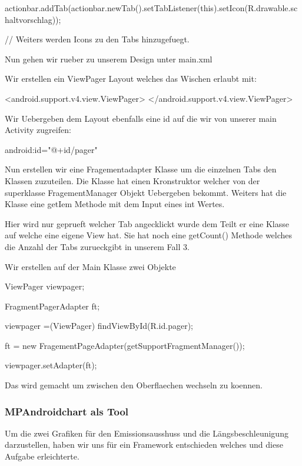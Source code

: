 actionbar.addTab(actionbar.newTab().setTabListener(this).setIcon(R.drawable.schaltvorschlag));

// Weiters werden Icons zu den Tabs hinzugefuegt.


Nun gehen wir rueber zu unserem Design unter main.xml

Wir erstellen ein ViewPager Layout welches das Wischen erlaubt mit:

<android.support.v4.view.ViewPager> </android.support.v4.view.ViewPager>

Wir Uebergeben dem Layout ebenfalls eine id auf die wir von unserer main Activity zugreifen: 

android:id="@+id/pager"



Nun erstellen wir eine Fragementadapter Klasse um die einzelnen Tabs den Klassen zuzuteilen. 
Die Klasse hat einen Kronstruktor welcher von der superklasse FragementManager Objekt Uebergeben bekommt.
Weiters hat die Klasse eine getIem Methode mit dem Input eines int Wertes. 


Hier wird nur geprueft welcher Tab angecklickt wurde dem Teilt er eine Klasse auf welche eine eigene View hat.
Sie hat noch eine getCount() Methode welches die Anzahl der Tabs zurueckgibt in unserem Fall 3.


Wir erstellen auf der Main Klasse zwei Objekte 

ViewPager viewpager;

FragmentPagerAdapter ft;

viewpager =(ViewPager) findViewById(R.id.pager);

ft = new FragementPageAdapter(getSupportFragmentManager());

viewpager.setAdapter(ft);

Das wird gemacht um zwischen den Oberflaechen wechseln zu koennen.

 
\subsubsection{MPAndroidchart als Tool}
Um die zwei Grafiken für den Emissionsausshuss und die Längsbeschleunigung darzustellen, haben wir uns für ein Framework entschieden welches und diese Aufgabe erleichterte.

